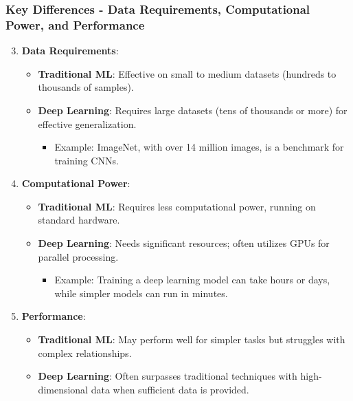 \documentclass[aspectratio=169]{beamer}
\begin{document}
\begin{frame}[fragile]
    \frametitle{Key Differences - Data Requirements, Computational Power, and Performance}
    \begin{enumerate}
        \setcounter{enumi}{2}
        \item \textbf{Data Requirements}:
        \begin{itemize}
            \item \textbf{Traditional ML}: Effective on small to medium datasets (hundreds to thousands of samples).
            \item \textbf{Deep Learning}: Requires large datasets (tens of thousands or more) for effective generalization.
                \begin{itemize}
                    \item Example: ImageNet, with over 14 million images, is a benchmark for training CNNs.
                \end{itemize}
        \end{itemize}

        \item \textbf{Computational Power}:
        \begin{itemize}
            \item \textbf{Traditional ML}: Requires less computational power, running on standard hardware.
            \item \textbf{Deep Learning}: Needs significant resources; often utilizes GPUs for parallel processing.
                \begin{itemize}
                    \item Example: Training a deep learning model can take hours or days, while simpler models can run in minutes.
                \end{itemize}
        \end{itemize}

        \item \textbf{Performance}:
        \begin{itemize}
            \item \textbf{Traditional ML}: May perform well for simpler tasks but struggles with complex relationships.
            \item \textbf{Deep Learning}: Often surpasses traditional techniques with high-dimensional data when sufficient data is provided.
        \end{itemize}
    \end{enumerate}
\end{frame}
\end{document}
